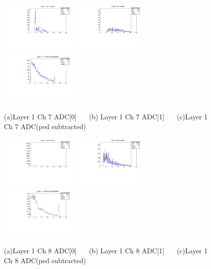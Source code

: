 \documentclass[a4paper,11pt]{article}
\theoremstyle{mytheor}
\begin{document}
\begin{figure}[H] 
\vspace*{-0.3cm} 
\includegraphics[width=0.33\textwidth,scale=0.5,trim=0 0 0 0,clip]{plotsdir/file0_test-Layer1_Ch7_adc0-1.pdf} 
\includegraphics[width=0.33\textwidth,scale=0.5,trim=0 0 0 0,clip]{plotsdir/file0_test-Layer1_Ch7_adc1-1.pdf} 
\includegraphics[width=0.33\textwidth,scale=0.5,trim=0 0 0 0,clip]{plotsdir/file0_test-Layer1_Ch7_adcPedsub-1.pdf} 
\caption{(a)Layer 1 Ch 7 ADC[0] ~~~(b) Layer 1 Ch 7 ADC[1] ~~~(c)Layer 1 Ch 7 ADC(ped subtracted) } 
\end{figure} 
\clearpage 
\begin{figure}[H] 
\vspace*{-0.3cm} 
\includegraphics[width=0.33\textwidth,scale=0.5,trim=0 0 0 0,clip]{plotsdir/file0_test-Layer1_Ch8_adc0-1.pdf} 
\includegraphics[width=0.33\textwidth,scale=0.5,trim=0 0 0 0,clip]{plotsdir/file0_test-Layer1_Ch8_adc1-1.pdf} 
\includegraphics[width=0.33\textwidth,scale=0.5,trim=0 0 0 0,clip]{plotsdir/file0_test-Layer1_Ch8_adcPedsub-1.pdf} 
\caption{(a)Layer 1 Ch 8 ADC[0] ~~~(b) Layer 1 Ch 8 ADC[1] ~~~(c)Layer 1 Ch 8 ADC(ped subtracted) } 
\end{figure} 
\end{document}
